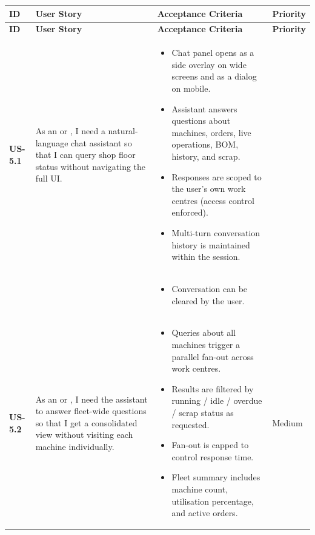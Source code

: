\begin{longtable}{p{1.5cm} p{5cm} p{6.5cm} p{2cm}}
	\hline
	\textbf{ID} & \textbf{User Story} & \textbf{Acceptance Criteria} & \textbf{Priority} \\
	\hline
	\endfirsthead
	\hline
	\textbf{ID} & \textbf{User Story} & \textbf{Acceptance Criteria} & \textbf{Priority} \\
	\hline
	\endhead

	\endlastfoot

	\textbf{US-5.1} &
	As an \userrole{Operator} or \userrole{Supervisor}, I need a natural-language
	chat assistant so that I can query shop floor status without navigating the full UI.
	&
	\begin{itemize}[nosep, leftmargin=*]
	\item Chat panel opens as a side overlay on wide screens and as a dialog on mobile.
	\item Assistant answers questions about machines, orders, live operations, BOM,
	history, and scrap.
	\item Responses are scoped to the user's own work centres (access control enforced).
	\item Multi-turn conversation history is maintained within the session.
	\end{itemize} \\ & &
  	\begin{itemize}[nosep, leftmargin=*]
	\item Conversation can be cleared by the user.
	\end{itemize}
	&  \\ \midrule

	\textbf{US-5.2} &
	As an \userrole{Operator} or \userrole{Supervisor}, I need the assistant to
	answer fleet-wide questions so that I
	get a consolidated view without visiting each machine individually.
	&
	\begin{itemize}[nosep, leftmargin=*]
	\item Queries about all machines trigger a parallel fan-out across work centres.
	\item Results are filtered by running / idle / overdue / scrap status as requested.
	\item Fan-out is capped to control response time.
	\item Fleet summary includes machine count, utilisation percentage, and active orders.
	\end{itemize}
	& Medium \\ \midrule


\end{longtable}
